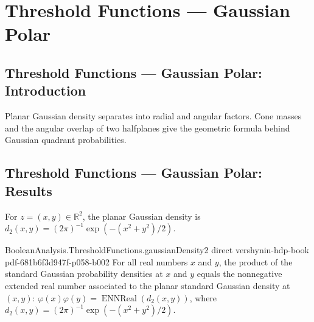 \section{Threshold Functions --- Gaussian Polar}
\subsection*{Threshold Functions --- Gaussian Polar: Introduction}
Planar Gaussian density separates into radial and angular factors. Cone masses and the angular overlap of two halfplanes give the geometric formula behind Gaussian quadrant probabilities.

\subsection*{Threshold Functions --- Gaussian Polar: Results}

\begin{definition}
\leanok
{}
For $z=(x,y)\in\mathbb R^2$, the planar Gaussian density is $d_2(x,y)=(2\pi)^{-1}\exp(-(x^2+y^2)/2)$.
\end{definition}

\begin{lemma}
\leanok
{}
\proofstep
  {BooleanAnalysis.ThresholdFunctions.gaussianDensity2}
  {direct}
  {vershynin-hdp-book}
  {pdf-681b6f3d947f-p058-b002}
For all real numbers $x$ and $y$, the product of the standard Gaussian probability
densities at $x$ and $y$ equals the nonnegative extended real number associated to the
planar standard Gaussian density at $(x,y)$:
$\varphi(x)\varphi(y)=\operatorname{ENNReal}(d_2(x,y))$, where
$d_2(x,y)=(2\pi)^{-1}\exp(-(x^2+y^2)/2)$.
\end{lemma}

